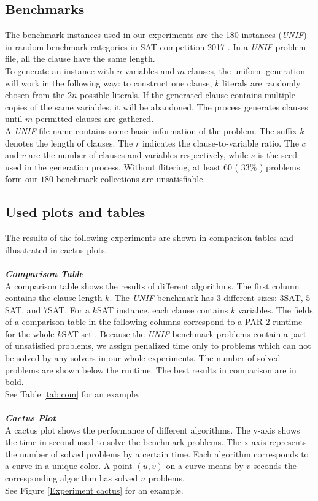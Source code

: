 \documentclass[12pt,a4paper,twoside]{scrartcl}
\numberwithin{equation}{section}
\begin{document}
\subsection{Benchmarks}
\label{benchmark}
The benchmark instances used in our experiments are the 180 instances (\emph{UNIF}) in random benchmark categories in SAT competition 2017 \cite{balyo2017proceedings}. In a \emph{UNIF} problem file, all the clause have the same length.\\
To generate an instance with $n$ variables and $m$ clauses, the uniform generation will work in the following way: to construct one clause, $k$ literals are randomly chosen from the $2n$ possible literals. If the generated clause contains multiple copies of the same variables, it will be abandoned. The process generates clauses until $m$ permitted clauses are gathered.\\
A \emph{UNIF} file name contains some basic information of the problem. The suffix $k$  denotes the length of clauses. The $r$ indicates the clause-to-variable ratio. The $c$ and $v$ are the number of clauses and variables respectively, while $s$ is the seed used in the generation process.
Without flitering, at least $60$ ( $33\%$ ) problems form our $180$ benchmark collections are unsatisfiable.
\clearpage
\subsection{Used plots and tables}
The results of the following experiments are shown in comparison tables and  illusatrated in cactus plots.  \\
\\
\emph{\textbf{Comparison Table}}\\
A comparison table shows the results of different algorithms. The first column contains the
clause length $k$. The  \emph{UNIF} benchmark has $3$ different sizes: $3$SAT, $5$SAT, and $7$SAT. For a $k$SAT instance, each clause contains $k$ variables. The fields of a comparison table in the following columns correspond to a PAR-2 runtime for the whole $k$SAT set \cite{balyo2017proceedings}. Because the  \emph{UNIF} benchmark problems contain a part of unsatisfied problems, we assign penalized time only to problems which can not be solved by any solvers in our whole experiments. The number of solved problems are shown below the runtime. The best results in comparison are in bold.
\\
See Table \ref{tab:com} for an example.\\
\\
\emph{\textbf{Cactus Plot}}\\
A cactus plot shows the performance of different algorithms. The y-axis shows the time in second used to solve the benchmark problems.  The x-axis represents the number of solved problems by a certain time. Each algorithm corresponds to a curve in a unique color. A point $(u, v)$ on a curve means by $v$ seconds the corresponding algorithm has solved  $u$ problems.  \\
See Figure \ref{Experiment cactus} for an example.\\
\end{document}
